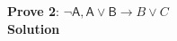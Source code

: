 \textbf{Prove 2}: $\mathsf{ \neg A, A \lor B} \rightarrow B \lor C$\\
\textbf{Solution}
\begin{prooftree}




\end{prooftree}
